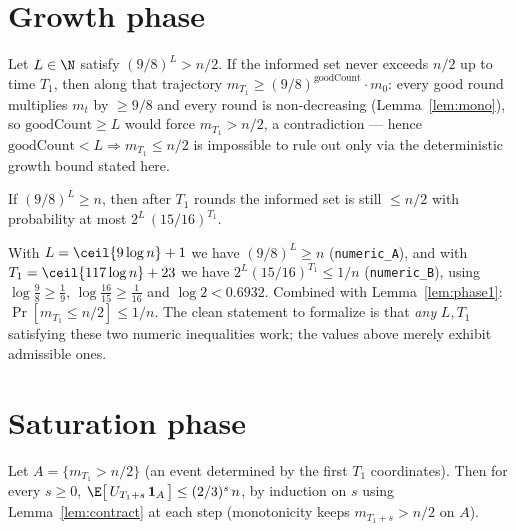 \section{Growth phase}\label{sec:growth}

\begin{lemma}\label{lem:force}
  \leanok
  Let $L \in \N$ satisfy $(9/8)^L > n/2$. If the informed set never exceeds
  $n/2$ up to time $T_1$, then along that trajectory
  $m_{T_1} \ge (9/8)^{\mathrm{goodCount}} \cdot m_0$: every good round
  multiplies $m_t$ by $\ge 9/8$ and every round is non-decreasing
  (Lemma~\ref{lem:mono}), so $\mathrm{goodCount} \ge L$ would force
  $m_{T_1} > n/2$, a contradiction — hence
  $\mathrm{goodCount} < L \Rightarrow m_{T_1} \le n/2$ is impossible to rule
  out only via the deterministic growth bound stated here.
\end{lemma}

\begin{lemma}[Phase 1]\label{lem:phase1}
  \leanok
  If $(9/8)^L \ge n$, then after $T_1$ rounds the informed set is still
  $\le n/2$ with probability at most $2^{L}\,(15/16)^{T_1}$.
\end{lemma}

\begin{lemma}\label{lem:constants}
  \leanok
  With $L = \ceil{9 \log n} + 1$ we have $(9/8)^L \ge n$
  (\texttt{numeric\_A}), and with $T_1 = \ceil{117 \log n} + 23$ we have
  $2^{L}(15/16)^{T_1} \le 1/n$ (\texttt{numeric\_B}), using
  $\log\tfrac98 \ge \tfrac19$, $\log\tfrac{16}{15} \ge \tfrac1{16}$ and
  $\log 2 < 0.6932$. Combined with Lemma~\ref{lem:phase1}:
  $\Pr[m_{T_1} \le n/2] \le 1/n$. The clean statement to formalize is that
  \emph{any} $L, T_1$ satisfying these two numeric inequalities work; the
  values above merely exhibit admissible ones.
\end{lemma}

\section{Saturation phase}\label{sec:saturation}

\begin{lemma}[Phase 2]\label{lem:phase2}
  \leanok
  Let $A = \{m_{T_1} > n/2\}$ (an event determined by the first $T_1$
  coordinates). Then for every $s \ge 0$,
  $\E\bigl[\, U_{T_1 + s}\, \mathbf{1}_A \,\bigr] \le (2/3)^{s}\, n$, by
  induction on $s$ using Lemma~\ref{lem:contract} at each step (monotonicity
  keeps $m_{T_1+s} > n/2$ on $A$).
\end{lemma}

